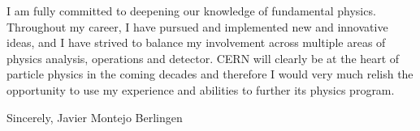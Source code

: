 \documentclass[11pt,a4paper,sans]{moderncv}        %
\begin{document}
I am fully committed to deepening our knowledge of fundamental physics.
Throughout my career, I have pursued and implemented new and innovative ideas, and I have strived to balance my involvement across multiple areas of physics analysis, operations and detector. 
CERN will clearly be at the heart of particle physics in the coming decades and 
therefore I would very much relish the opportunity to use my experience and 
abilities to further its physics program.
\newline


Sincerely,
\newline
\newline
\newline
Javier Montejo Berlingen
\end{document}

